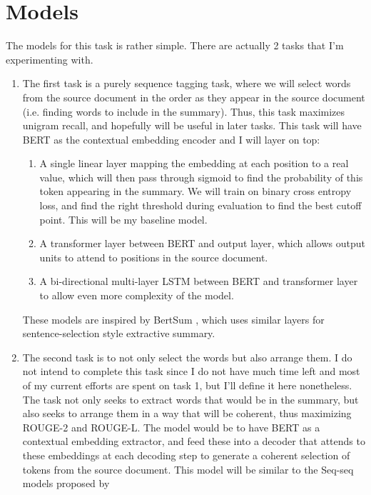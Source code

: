 \documentclass[11pt,a4paper]{article}
\begin{document}
\section{Models}
The models for this task is rather simple. There are actually 2 tasks that I'm experimenting with.
\begin{enumerate}
	\item The first task is a purely sequence tagging task, where we will select words from the source document in the order as they appear in the source document (i.e. finding words to include in the summary). Thus, this task maximizes unigram recall, and hopefully will be useful in later tasks. This task will have BERT as the contextual embedding encoder and I will layer on top:
	\begin{enumerate}
		\item A single linear layer mapping the embedding at each position to a real value, which will then pass through sigmoid to find the probability of this token appearing in the summary. We will train on binary cross entropy loss, and find the right threshold during evaluation to find the best cutoff point. This will be my baseline model.
		\item A transformer layer between BERT and output layer, which allows output units to attend to positions in the source document.
		\item A bi-directional multi-layer LSTM between BERT and transformer layer to allow even more complexity of the model.
	\end{enumerate}
	These models are inspired by BertSum \cite{bert-sum}, which uses similar layers for sentence-selection style extractive summary.
	
	\item The second task is to not only select the words but also arrange them. I do not intend to complete this task since I do not have much time left and most of my current efforts are spent on task 1, but I'll define it here nonetheless. The task not only seeks to extract words that would be in the summary, but also seeks to arrange them in a way that will be coherent, thus maximizing ROUGE-2 and ROUGE-L. The model would be to have BERT as a contextual embedding extractor, and feed these into a decoder that attends to these embeddings at each decoding step to generate a coherent selection of tokens from the source document. This model will be similar to the Seq-seq models proposed by \cite{lead}
\end{enumerate}
\end{document}
